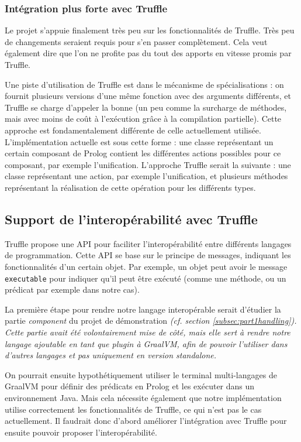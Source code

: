 \documentclass[../report.tex]{subfiles}
\begin{document}
\subsubsection{Intégration plus forte avec Truffle}
Le projet s'appuie finalement très peu sur les fonctionnalités de Truffle. Très peu de changements seraient requis pour s'en passer complètement. Cela veut également dire que l'on ne profite pas du tout des apports en vitesse promis par Truffle.

Une piste d'utilisation de Truffle est dans le mécanisme de spécialisations : on fournit plusieurs versions d'une même fonction avec des arguments différents, et Truffle se charge d'appeler la bonne (un peu comme la surcharge de méthodes, mais avec moins de coût à l'exécution grâce à la compilation partielle). Cette approche est fondamentalement différente de celle actuellement utilisée. L'implémentation actuelle est sous cette forme : une classe représentant un certain composant de Prolog contient les différentes actions possibles pour ce composant, par exemple l'unification. L'approche Truffle serait la suivante : une classe représentant une action, par exemple l'unification, et plusieurs méthodes représentant la réalisation de cette opération pour les différents types.
\subsection{Support de l'interopérabilité avec Truffle}
Truffle propose une API pour faciliter l'interopérabilité entre différents langages de programmation. Cette API se base sur le principe de messages, indiquant les fonctionnalités d'un certain objet. Par exemple, un objet peut avoir le message \texttt{executable} pour indiquer qu'il peut être exécuté (comme une méthode, ou un prédicat par exemple dans notre cas).

La première étape pour rendre notre langage interopérable serait d'étudier la partie \textit{component} du projet de démonstration \sl{} (cf. section \ref{subsec:part1handling}). Cette partie avait été volontairement mise de côté, mais elle sert à rendre notre langage ajoutable en tant que plugin à GraalVM, afin de pouvoir l'utiliser dans d'autres langages et pas uniquement en version \textit{standalone}. 

On pourrait ensuite hypothétiquement utiliser le terminal multi-langages de GraalVM pour définir des prédicats en Prolog et les exécuter dans un environnement Java. Mais cela nécessite également que notre implémentation utilise correctement les fonctionnalités de Truffle, ce qui n'est pas le cas actuellement. Il faudrait donc d'abord améliorer l'intégration avec Truffle pour ensuite pouvoir proposer l'interopérabilité.
\end{document}
